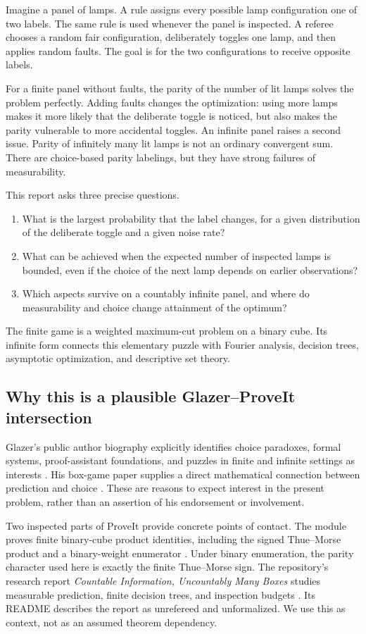 \documentclass[11pt,a4paper]{article}
\theoremstyle{definition}
\theoremstyle{remark}
\begin{document}
Imagine a panel of lamps. A rule assigns every possible lamp configuration
one of two labels. The same rule is used whenever the panel is inspected.
A referee chooses a random fair configuration, deliberately toggles one
lamp, and then applies random faults. The goal is for the two configurations
to receive opposite labels.

For a finite panel without faults, the parity of the number of lit lamps
solves the problem perfectly. Adding faults changes the optimization:
using more lamps makes it more likely that the deliberate toggle is
noticed, but also makes the parity vulnerable to more accidental toggles.
An infinite panel raises a second issue. Parity of infinitely many lit
lamps is not an ordinary convergent sum. There are choice-based parity
labelings, but they have strong failures of measurability.

This report asks three precise questions.
\begin{enumerate}
\item What is the largest probability that the label changes, for a given
distribution of the deliberate toggle and a given noise rate?
\item What can be achieved when the expected number of inspected lamps is
bounded, even if the choice of the next lamp depends on earlier observations?
\item Which aspects survive on a countably infinite panel, and where do
measurability and choice change attainment of the optimum?
\end{enumerate}
The finite game is a weighted maximum-cut problem on a binary cube. Its
infinite form connects this elementary puzzle with Fourier analysis,
decision trees, asymptotic optimization, and descriptive set theory.

\subsection{Why this is a plausible Glazer--ProveIt intersection}

Glazer's public author biography explicitly identifies choice paradoxes,
formal systems, proof-assistant foundations, and puzzles in finite and
infinite settings as interests \cite{glazerbio}. His box-game paper supplies
a direct mathematical connection between prediction and choice
\cite{glazerbox}. These are reasons to expect interest in the present
problem, rather than an assertion of his endorsement or involvement.

Two inspected parts of ProveIt provide concrete points of contact.
The module  proves finite binary-cube
product identities, including the signed Thue--Morse product and a
binary-weight enumerator \cite{repocube}. Under binary enumeration,
the parity character used here is exactly the finite Thue--Morse sign.
The repository's research report \emph{Countable Information,
Uncountably Many Boxes} studies measurable prediction, finite decision
trees, and inspection budgets \cite{repobox}. Its README describes the
report as unrefereed and unformalized. We use this as context, not as an
assumed theorem dependency.
\end{document}
